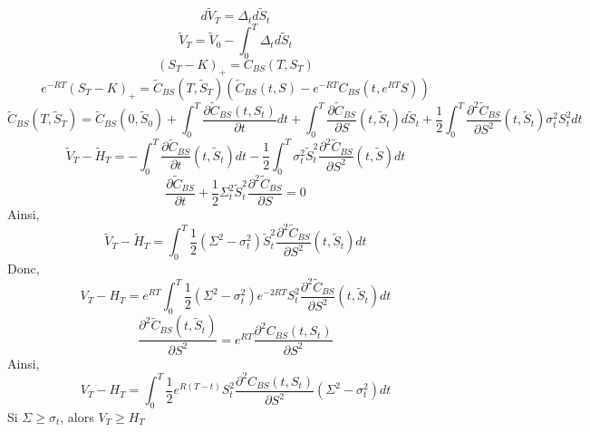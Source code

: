 \documentclass{article}
\theoremstyle{plain}
\theoremstyle{definition}
\begin{document}
\begin{equation}
d\tilde{V}_T=\Delta_td\tilde{S}_t
\end{equation}
\begin{equation}
\tilde{V}_T=\tilde{V}_0-\int_0^T\Delta_td\tilde{S}_t
\end{equation}
\begin{equation}
(S_T-K)_+=C_{BS}(T,S_T)
\end{equation}
\begin{equation}
e^{-RT}(S_T-K)_+=\tilde{C}_{BS}(T,\tilde{S}_T)(\tilde{C}_{BS}(t,S)-e^{-RT}C_{BS}(t,e^{RT}S))
\end{equation}
\begin{equation}
\tilde{C}_{BS}(T,\tilde{S}_T)=\tilde{C}_{BS}(0,\tilde{S}_0)+\int_0^T\frac{\partial \tilde{C}_{BS}(t,S_t)}{\partial t}dt+\int_0^T\frac{\partial\tilde{C}_{BS}}{\partial S}(t,\tilde{S}_t)d\tilde{S}_t+\frac{1}{2}\int_0^T\frac{\partial^2 \tilde{C}_{BS}}{\partial S^2}(t,\tilde{S}_t)\sigma_t^2S_t^2dt
\end{equation}
\begin{equation}
\tilde{V}_T-\tilde{H}_T=-\int_0^T\frac{\partial \tilde{C}_{BS}}{\partial t}(t,\tilde{S}_t)dt-\frac{1}{2}\int_0^T\sigma_t^2\tilde{S}_t^2\frac{\partial^2\tilde{C}_{BS}}{\partial S^2}(t,\tilde{S})dt
\end{equation}
\begin{equation}
\frac{\partial\tilde{C}_{BS}}{\partial t}+\frac{1}{2}\Sigma_t^2\tilde{S}_t^2\frac{\partial^2\tilde{C}_{BS}}{\partial S}=0
\end{equation}
Ainsi,
\begin{equation}
\tilde{V}_T-\tilde{H}_T=\int_0^T\frac{1}{2}(\Sigma^2-\sigma_t^2)\tilde{S}_t^2\frac{\partial^2\tilde{C}_{BS}}{\partial S^2}(t,\tilde{S}_t)dt
\end{equation}
Donc,
\begin{equation}
V_T-H_T=e^{RT}\int_0^T\frac{1}{2}(\Sigma^2-\sigma_t^2)e^{-2RT}S_t^2\frac{\partial^2\tilde{C}_{BS}}{\partial S^2}(t,\tilde{S}_t)dt
\end{equation}
\begin{equation}
\frac{\partial^2\tilde{C}_{BS}(t,\tilde{S}_t)}{\partial S^2}=e^{RT}\frac{\partial^2C_{BS}(t,S_t)}{\partial S^2}
\end{equation}
Ainsi,
\begin{equation}
V_T-H_T=\int_0^T\frac{1}{2}e^{R(T-t)}S_t^2\frac{\partial^2C_{BS}(t,S_t)}{\partial S^2}(\Sigma^2-\sigma^2_t)dt
\end{equation}
Si $\Sigma\geq\sigma_t$, alors $V_T\geq H_T$
\end{document}
